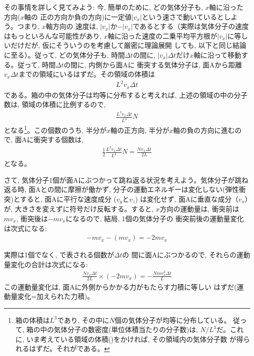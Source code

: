 その事情を詳しく見てみよう: 今, 簡単のために, どの気体分子も, $x$軸に沿った方向($x$軸の
正の方向か負の方向)に一定値$|v_x|$という速さで動いているとしよう。つまり, $x$軸方向の
速度は, $|v_x|$か$-|v_x|$であるとする（実際は気体分子の速度はもっといろんな可能性があり, 
$x$軸に沿った速度の二乗平均平方根が$|v_x|$に等しいだけだが, 仮にそういうのを考慮して厳密に理論展開
しても, 以下と同じ結論に至る）。従って, どの気体分子も, 時間$\Delta t$の間に, 
$|v_x| \Delta t$だけ$x$軸に沿って移動する。従って, 時間$\Delta t$の間に, 内側から面Aに
衝突する気体分子は, 面Aから距離$v_x \Delta t$までの領域にいるはずだ。その領域の体積は
\begin{eqnarray}L^2v_x\Delta t\label{eq:gas_stat_eq_0}\end{eqnarray}
である。箱の中の気体分子は均等に分布すると考えれば, 上述の領域の中の分子数は, 
領域の体積に比例するので, 
\begin{eqnarray}\frac{L^2v_x\Delta t}{L^3}N\label{eq:gas_stat_eq_1}\end{eqnarray}
となる\footnote{箱の体積は$L^3$であり, その中に$N$個の気体分子が均等に分布している。
従って, 箱の中の気体分子の数密度(単位体積当たりの分子数)は, $N/L^3$だ。これに, 
いま考えている領域の体積()をかければ, その領域内の気体分子数
が得られるはずだ。それがである。}。この個数のうち, 
半分が$x$軸の正方向, 半分が$x$軸の負の方向に進むので, 面Aに衝突する個数は, 
\begin{eqnarray}
\frac{1}{2}\frac{L^2v_x\Delta t}{L^3}N=\frac{Nv_x\Delta t}{2L}\label{fig:gas_motion_hitnum}
\end{eqnarray}
となる。

さて, 気体分子1個が面Aにぶつかって跳ね返る状況を考えよう。気体分子が跳ね返る時, 
面Aとの間に摩擦が働かず, 分子の運動エネルギーは変化しない(弾性衝突)とすると, 
面Aに平行な速度成分 ($v_y$と$v_z$) は変化せず, 面Aに垂直な成分（$v_x$）が, 
大きさを変えずに符号だけ反転する。すると, $x$方向の運動量は, 
衝突前は$mv_x$, 衝突後は$-mv_x$になるので, 結局, 1個の気体分子の
衝突前後の運動量変化は次式になる:
\begin{eqnarray}
-mv_x-(mv_x)=-2mv_x\label{fig:gas_motion_changemom}
\end{eqnarray}

実際は1個でなく, で表される個数が$\Delta t$の
間に面Aにぶつかるので, それらの運動量変化の合計は次式になる:
\begin{eqnarray}
\frac{Nv_x\Delta t}{2L}\times(-2mv_x)=-\frac{Nmv_x^2\Delta t}{L}\label{eq:gas_motion_collide}
\end{eqnarray}
この運動量変化は, 面Aに外側からかかる力がもたらす力積に等しい
はずだ(運動量変化=加えられた力積)。

